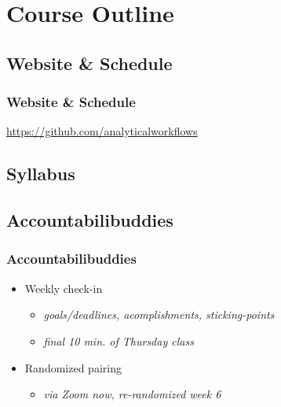 \documentclass{beamer}
\begin{document}
\section{Course Outline}


\subsection{Website \& Schedule}

\begin{frame}
    \frametitle{Website \& Schedule}
    \url{https://github.com/analyticalworkflows}

\end{frame}


\subsection{Syllabus}


\subsection{Accountabilibuddies}

\begin{frame}
  \frametitle{Accountabilibuddies}

  \begin{itemize}
    \item Weekly check-in
    \begin{itemize}
      \item[] \emph{goals/deadlines, acomplishments, sticking-points}\\
      \item[] \emph{final 10 min. of Thursday class}
    \end{itemize}
    \item Randomized pairing
    \begin{itemize}
      \item[] \emph{via Zoom now, re-randomized week 6}
    \end{itemize}
  \end{itemize}

\end{frame}
\end{document}
